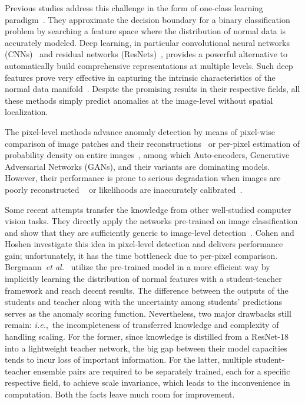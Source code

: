 \documentclass{bmvc2k}
\def\ie{\emph{i.e.}} \def\Ie{\emph{I.e}}
\begin{document}
Previous studies address this challenge in the form of one-class learning paradigm~\cite{Moya1993}. They approximate the decision boundary for a binary classification problem by searching a feature space where the distribution of normal data is accurately modeled. Deep learning, in particular convolutional neural networks (CNNs)~\cite{Lecun1998} and residual networks (ResNets)~\cite{He2016}, provides a powerful alternative to automatically build comprehensive representations at multiple levels. Such deep features prove very effective in capturing the intrinsic characteristics of the normal data manifold~\cite{An2015,Chalapathy2018,Masana2018,Ruff2018,Zhou2017}. Despite the promising results in their respective fields, all these methods simply predict anomalies at the image-level without spatial localization.


The pixel-level methods advance anomaly detection by means of pixel-wise comparison of image patches and their reconstructions~\cite{Baur2018,Schlegl2019,Schlegl2017} or per-pixel estimation of probability density on entire images~\cite{Abati2019,Seebock2016}, among which Auto-encoders, Generative Adversarial Networks (GANs), and their variants are dominating models. However, their performance is prone to serious degradation when images are poorly reconstructed ~\cite{Bergmann2019b} or likelihoods are inaccurately calibrated~\cite{Nalisnick2019}.

Some recent attempts transfer the knowledge from other well-studied computer vision tasks. They directly apply the networks pre-trained on image classification and show that they are sufficiently generic to image-level detection~\cite{Andrews2016,Burlina2019,Erfani2016}. Cohen and Hoshen \cite{Cohen2020} investigate this idea in pixel-level detection and delivers performance gain; unfortunately, it has the time bottleneck due to per-pixel comparison. 
Bergmann~\textit{et al.}~\cite{Bergmann2020} utilize the pre-trained model in a more efficient way by implicitly learning the distribution of normal features with a student-teacher framework and reach decent results.
The difference between the outputs of the students and teacher along with the uncertainty among students' predictions serves as the anomaly scoring function. Nevertheless, two major drawbacks still remain: \ie,~the incompleteness of transferred knowledge and complexity of handling scaling. For the former, since knowledge is distilled from a ResNet-18~\cite{He2016} into a lightweight teacher network, the big gap between their model capacities~\cite{Wang2020} tends to incur loss of important information. For the latter, multiple student-teacher ensemble pairs are required to be separately trained, each for a specific respective field, to achieve scale invariance, which leads to the inconvenience in computation. Both the facts leave much room for improvement.
\end{document}
